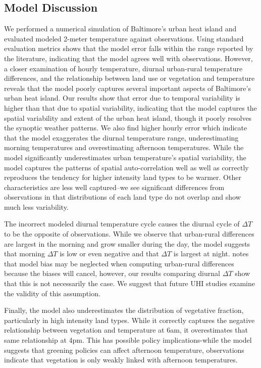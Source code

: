\documentclass[draft,linenumbers]{agujournal}
\begin{document}
\subsection{Model Discussion}
We performed a numerical simulation of Baltimore's urban heat island and evaluated modeled 2-meter temperature against observations. Using standard evaluation metrics shows that the model error falls within the range reported by the literature, indicating that the model agrees well with observations. However, a closer examination of hourly temperature, diurnal urban-rural temperature differences, and the relationship between land use or vegetation and temperature reveals that the model poorly captures several important aspects of Baltimore's urban heat island. 
Our results show that error due to temporal variability is higher than that due to spatial variability, indicating that the model captures the spatial variability and extent of the urban heat island, though it poorly resolves the synoptic weather patterns. We also find higher hourly error which indicate that the model exaggerates the diurnal temperature range, underestimating morning temperatures and overestimating afternoon temperatures. 
While the model significantly underestimates urban temperature's spatial variability, the model captures the patterns of spatial auto-correlation well as well as correctly reproduces the tendency for higher intensity land types to be warmer. Other characteristics are less well captured--we see significant differences from observations in that distributions of each land type do not overlap and show much less variability. 

 The incorrect modeled diurnal temperature cycle causes the diurnal cycle of $\Delta T$ to be the opposite of observations. While we observe that urban-rural differences are largest in the morning and grow smaller during the day, the model suggests that morning $\Delta T$ is low or even negative and that $\Delta T$ is largest at night. \cite{lisynergistic2003} notes that model bias may be neglected when computing urban-rural differences because the biases will cancel, however, our results comparing diurnal $\Delta T$  show that this is not necessarily the case. We suggest that future UHI studies examine the validity of this assumption. 

Finally, the model also underestimates the distribution of vegetative fraction, particularly in high intensity land types. While it correctly captures the negative relationship between vegetation and temperature at 6am, it overestimates that same relationship at 4pm. This has possible policy implications-while the model suggests that greening policies can affect afternoon temperature, observations indicate that vegetation is only weakly linked with afternoon temperatures.
% 
\end{document}
